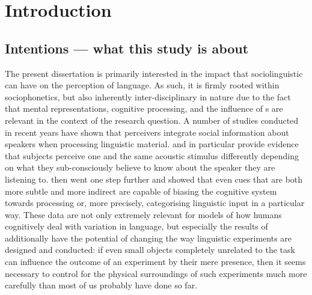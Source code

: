 \chapter{Introduction}
\label{ch.intro}

\section{Intentions --- what this study is about}
\label{sec.intro.intent}

The present dissertation is primarily interested in the impact that sociolinguistic  can have on the perception of language.
As such, it is firmly rooted within sociophonetics, but also inherently inter-disciplinary in nature due to the fact that mental representations, cognitive processing, and the influence of s are relevant in the context of the research question.
A number of studies conducted in recent years have shown that perceivers integrate social information about speakers when processing linguistic material.
\textcite{niedzielski1999} and \textcite{hayetal2006a} in particular provide evidence that subjects perceive one and the same acoustic stimulus differently depending on what they sub-consciously believe to know about the speaker they are listening to.
\textcite{haydrager2010} then went one step further and showed that even cues that are both more subtle and more indirect are capable of biasing the cognitive system towards processing or, more precisely, categorising linguistic input in a particular way.
These data are not only extremely relevant for models of how humans cognitively deal with variation in language, but especially the results of \textcite{haydrager2010} additionally have the potential of changing the way linguistic experiments are designed and conducted: if even small objects completely unrelated to the task can influence the outcome of an experiment by their mere presence, then it seems necessary to control for the physical surroundings of such experiments much more carefully than most of us probably have done so far.


